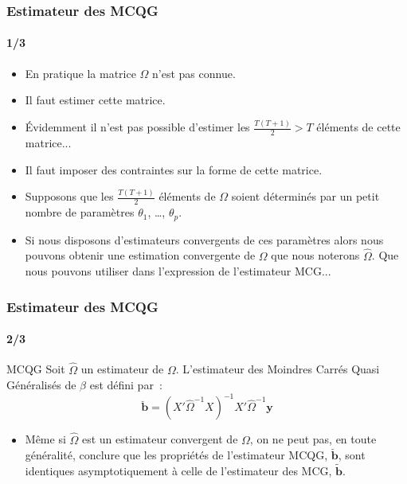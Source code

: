 \documentclass[10pt]{beamer}
\begin{document}
\begin{frame}
  \frametitle{Estimateur des MCQG}
  \framesubtitle{1/3}

  \begin{itemize}

  \item En pratique la matrice $\Omega$ n'est pas connue.\newline

  \item Il faut estimer cette matrice.\newline

  \item Évidemment il n'est pas possible d'estimer les $\frac{T(T+1)}{2}>T$ éléments de cette matrice...\newline

  \item Il faut imposer des contraintes sur la forme de cette matrice.\newline

  \item Supposons que les $\frac{T(T+1)}{2}$ éléments de $\Omega$ soient déterminés par un petit nombre de paramètres $\theta_1$, \ldots, $\theta_p$.\newline

  \item Si nous disposons d'estimateurs convergents de ces paramètres alors nous pouvons obtenir une estimation convergente de $\Omega$ que nous noterons $\widehat \Omega$. Que nous pouvons utiliser dans l'expression de l'estimateur MCG...

  \end{itemize}

\end{frame}


\begin{frame}
  \frametitle{Estimateur des MCQG}
  \framesubtitle{2/3}

  \begin{defn}{MCQG}
    Soit $\widehat\Omega$ un estimateur de $\Omega$. L'estimateur des Moindres Carrés Quasi Généralisés de $\beta$ est défini par~:
    \[
      \breve{\mathbf b} = \left( X'\widehat{\Omega}^{-1}X \right)^{-1}X'\widehat{\Omega}^{-1}\mathbf y
    \]
  \end{defn}

  \bigskip\medskip

  \begin{itemize}

  \item[\dbend] Même si $\widehat\Omega$ est un estimateur convergent de $\Omega$, on ne peut pas, en toute généralité, conclure que les propriétés de l'estimateur MCQG, $\breve{\mathbf b}$, sont identiques asymptotiquement à celle de l'estimateur des MCG, $\tilde{\mathbf b}$.

  \end{itemize}

\end{frame}
\end{document}
